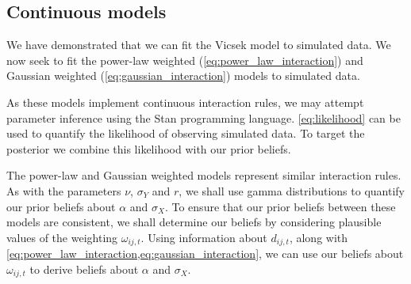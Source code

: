 \subsection{Continuous models}
\label{ssec:continuous_models}

We have demonstrated that we can fit the Vicsek model to simulated data. We
now seek to fit the power-law weighted (\cref{eq:power_law_interaction}) and
Gaussian weighted (\cref{eq:gaussian_interaction}) models to simulated data.

As these models implement continuous interaction rules, we may attempt
parameter inference using the Stan programming language. \cref{eq:likelihood}
can be used to quantify the likelihood of observing simulated data. To target
the posterior we combine this likelihood with our prior beliefs.

The power-law and Gaussian weighted models represent similar interaction rules.
As with the parameters $\nu$, $\sigma_Y$ and $r$, we shall use gamma
distributions to quantify our prior beliefs about $\alpha$ and $\sigma_X$. To
ensure that our prior beliefs between these models are consistent, we shall
determine our beliefs by considering plausible values of the weighting
$\omega_{ij,t}$. Using information about $d_{ij,t}$, along with
\cref{eq:power_law_interaction,eq:gaussian_interaction}, we can use our beliefs
about $\omega_{ij,t}$ to derive beliefs about $\alpha$ and $\sigma_X$.

